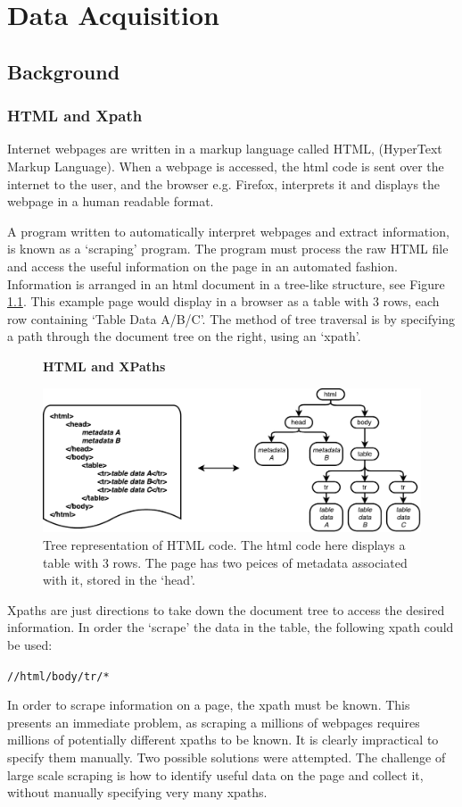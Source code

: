 \chapter{Data Acquisition}

\section{Background}
\subsection{HTML and Xpath}

Internet webpages are written in a markup language called HTML, (HyperText Markup Language). When a webpage is accessed, the html code is sent over the internet to the user, and the browser e.g. Firefox, interprets it and displays the webpage in a human readable format. 

A program written to automatically interpret webpages and extract information, is known as a `scraping' program. The program must process the raw HTML file and access the useful information on the page in an automated fashion. Information is arranged in an html document in a tree-like structure, see Figure \ref{fig:HTMLTREE}. This example page would display in a browser as a table with 3 rows, each row containing `Table Data A/B/C'. The method of tree traversal is by specifying a path through the document tree on the right, using an `xpath'. 
\begin{figure}[H]
    \centering
    \textbf{HTML and XPaths}\par\medskip
    \includegraphics[scale=0.7]{Data_Acquisition/html_tree.pdf}
    \caption{Tree representation of HTML code. The html code here displays a table with 3 rows. The page has two peices of metadata associated with it, stored in the `head'.\label{fig:HTMLTREE}}
\end{figure}
Xpaths are just directions to take down the document tree to access the desired information. In order the `scrape' the data in the table, the following xpath could be used:
\begin{center}
\texttt{//html/body/tr/*}
\end{center}
In order to scrape information on a page, the xpath must be known. 
This presents an immediate problem, as scraping a millions of webpages requires millions of potentially different xpaths to be known. It is clearly impractical to specify them manually. Two possible solutions were attempted.
The challenge of large scale scraping is how to identify useful data on the page and collect it, without manually specifying very many xpaths.
